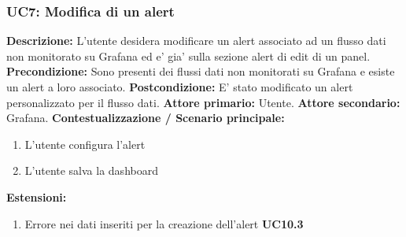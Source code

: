                 \subsubsection{UC7: Modifica di un alert}
                    \textbf{Descrizione:} L’utente desidera modificare un alert associato ad un flusso dati non monitorato su Grafana ed e’ gia’ sulla sezione alert di edit di un panel.
                    \newline
                    \textbf{Precondizione:} Sono presenti dei flussi dati non monitorati su Grafana e esiste un alert a loro associato.
                    \newline
                    \textbf{Postcondizione:} E’ stato modificato un alert personalizzato per il flusso dati.
                    \newline
                    \textbf{Attore primario:} Utente.
                    \newline
                    \textbf{Attore secondario:} Grafana.
                    \newline
                    \textbf{Contestualizzazione / Scenario principale:} \begin{enumerate}
                            \item L’utente configura l’alert 
                            \item L’utente salva la dashboard
                        \end{enumerate}
                    
                    \textbf{Estensioni:} 
                    \begin{enumerate}
                            \item Errore nei dati inseriti per la creazione dell'alert \textbf{UC10.3}
                        \end{enumerate}
                        
